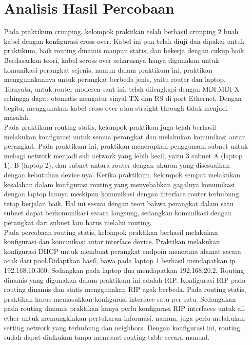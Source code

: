 \section{Analisis Hasil Percobaan}
Pada praktikum crimping, kelompok praktikan telah berhasil crimping 2 buah kabel dengan konfigurasi cross over. Kabel ini pun telah diuji dan dipakai untuk praktikum, baik routing dinamis maupun statis, dan bekerja dengan cukup baik. Berdasarkan teori, kabel scross over seharusnya hanya digunakan untuk komunikasi perangkat sejenis, namun dalam praktikum ini, praktikan menggunakannya untuk perangkat berbeda jenis, yaitu router dan laptop. Ternyata, untuk router moderen saat ini, telah dilengkapi dengan MDI.MDI-X sehingga dapat otomatis mengatur sinyal TX dan RS di port Ethernet. Dengan begitu, menggunakan kabel cross over atau straight through tidak menjadi masalah. \\
Pada praktikum routing statis, kelompok praktikan juga telah berhasil melakukan konfigurasi untuk semua perangkat dan melakukan komunikasi antar perangkat. Pada praktikum ini, praktikan menerapkan penggunaan subnet untuk mebagi network menjadi sub network yang lebih kecil, yaitu 3 subnet A (laptop 1), B (laptop 2), dan subnet antara router dengan ukuran yang disesuaikan dengan kebutuhan device nya. Ketika praktikum, kelompok sempat melakukan kesalahan dalam konfigurasi routing yang menyebabkan gagalnya komunikasi dengan laptop lannya meskipun komunikasi dengan interface router terhubung tetap berjalan baik. Hal ini sesuai dengan teori bahwa perangkat dalam satu subnet dapat berkomunikasi secara langsung, sedangkan komunikasi dengan perangkat dari subnet lain harus melalui routing. \\
Pada percobaan routing statis, kelompok praktikan berhasil melakukan konfigurasi dan komunikasi antar interface device. Praktikan melakukan konfigurasi DHCP untuk membuat perangkat endpoin menerima alamat secara acak dari pool.Didaptkan hasil, bawa pada laptop 1 berhasil mendapatkan ip 192.168.10.300. Sedangkan pada laptop dua mendapatkan 192.168.20.2.   Routing dinamis yang digunakan dalam praktikum ini adalah RIP. Konfigurasi RIP pada routing dinamis dan statis menggunakan RIP agak berbeda. Pada routing statis, praktikan harus memasukkan konfigurasi interface satu per satu. Sedangakan pada routing dinamis praktikan hanya perlu konfigurasi RIP interfaces untuk all ether untuk memungkinkan pertukaran informasi. namun, juga perlu melakukan setting network yang terhubung dan neighbors. Dengan konfigurasi ini, routing sudah dapat dialkukan tanpa membuat routing table secara manual.\\

